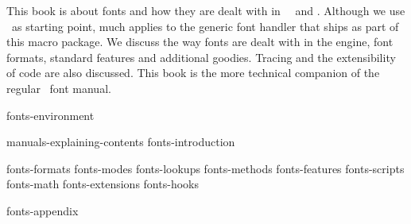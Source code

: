 
%

%


\enablemode[simple] %

\startbuffer[abstract]

    This book is about fonts and how they are dealt with in \CONTEXT\ \MKIV\ and
    \LUATEX. Although we use \CONTEXT\ as starting point, much applies to the
    generic font handler that ships as part of this macro package. We discuss the
    way fonts are dealt with in the engine, font formats, standard features and
    additional goodies. Tracing and the extensibility of code are also discussed.
    This book is the more technical companion of the regular \CONTEXT\ font
    manual.

\stopbuffer

\environment fonts-environment

\startdocument
  [author=Hans Hagen,
   title=Fonts out of \ConTeXt,
   subtitle=explaining luatex and mkiv,
   affiliation=PRAGMA ADE,
   comment=work in progress,
   cover:color:1=darkred,
   cover:color:2=darkgreen,
   cover:color:3=darkblue,
   cover:color:4=darkyellow,
   cover:color:5=darkgray]

    \startfrontmatter
        \component manuals-explaining-contents
        \component fonts-introduction
    \stopfrontmatter

    \startbodymatter
        \component fonts-formats
        \component fonts-modes
        \component fonts-lookups
        \component fonts-methods
        \component fonts-features
        \component fonts-scripts
        \component fonts-math
        \component fonts-extensions
        \component fonts-hooks
    \stopbodymatter

    \startappendices
        \component fonts-appendix
    \stopappendices

\stopdocument
